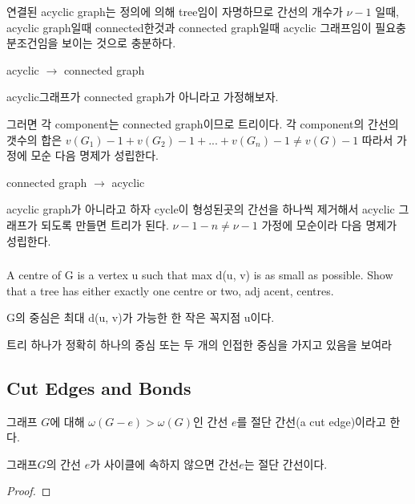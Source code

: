 연결된 acyclic graph는 정의에 의해 tree임이 자명하므로 간선의 개수가 $\nu -1$  일때, acyclic graph일때 connected한것과 connected graph일때 acyclic 그래프임이 필요충분조건임을 보이는 것으로 충분하다.

acyclic $\rightarrow$ connected graph

acyclic그래프가 connected graph가 아니라고 가정해보자.

그러면 각 component는 connected graph이므로 트리이다.
각 component의 간선의 갯수의 합은 $v(G_1)-1 + v(G_2)-1 + ... + v(G_n)-1 \neq v(G)-1 $
따라서 가정에 모순 다음 명제가 성립한다.

connected graph $\rightarrow$ acyclic

acyclic graph가 아니라고 하자 cycle이 형성된곳의 간선을 하나씩 제거해서 acyclic 그래프가 되도록 만들면 트리가 된다.
$\nu-1-n \neq \nu -1 $ 가정에 모순이라 다음 명제가 성립한다.
\subsubsection{} 
%
\subsubsection{} 
%
\subsubsection{} 
A centre of G is a vertex u such that max d(u, v) is as small as possible.
Show that a tree has either exactly one centre or two,
adj acent, centres.


G의 중심은 최대 d(u, v)가 가능한 한 작은 꼭지점 u이다.

트리 하나가 정확히 하나의 중심 또는 두 개의 인접한 중심을 가지고 있음을 보여라

\subsection{Cut Edges and Bonds}
\begin{dfn}
    
    그래프 $G$에 대해 $\omega(G-e)>\omega(G)$인 간선 $e$를 절단 간선(a cut edge)이라고 한다.

\end{dfn}

\begin{theorem}
    그래프$G$의 간선 $e$가 사이클에 속하지 않으면 간선$e$는 절단 간선이다.
\end{theorem}

\begin{proof}
    
\end{proof}

